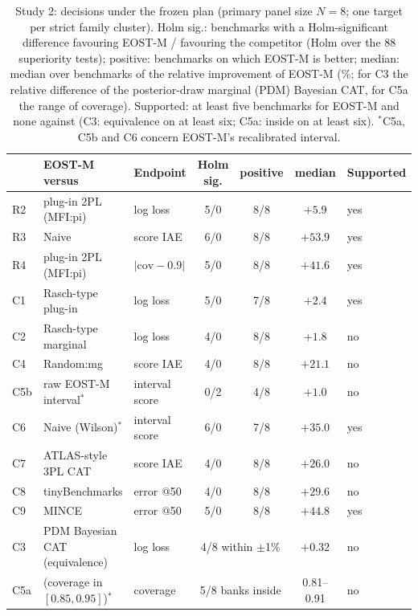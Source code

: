 \begin{table}[tbp]
\centering\footnotesize
\caption{Study 2: decisions under the frozen plan (primary panel size $N=8$; one target per strict family cluster). Holm sig.: benchmarks with a Holm-significant difference favouring EOST-M / favouring the competitor (Holm over the 88 superiority tests); positive: benchmarks on which EOST-M is better; median: median over benchmarks of the relative improvement of EOST-M (\%; for C3 the relative difference of the posterior-draw marginal (PDM) Bayesian CAT, for C5a the range of coverage). Supported: at least five benchmarks for EOST-M and none against (C3: equivalence on at least six; C5a: inside on at least six). $^\ast$C5a, C5b and C6 concern EOST-M's recalibrated interval.}
\label{tab:study2}
\setlength{\tabcolsep}{3pt}
\begin{tabular}{@{}lllcccl@{}}
\toprule
 & EOST-M versus & Endpoint & Holm sig. & positive & median & Supported \\
\midrule
R2 & plug-in 2PL (MFI:pi) & log loss & 5/0 & 8/8 & $+5.9$ & yes \\
R3 & Naive & score IAE & 6/0 & 8/8 & $+53.9$ & yes \\
R4 & plug-in 2PL (MFI:pi) & $|\mathrm{cov}-0.9|$ & 5/0 & 8/8 & $+41.6$ & yes \\
C1 & Rasch-type plug-in & log loss & 5/0 & 7/8 & $+2.4$ & yes \\
C2 & Rasch-type marginal & log loss & 4/0 & 8/8 & $+1.8$ & no \\
C4 & Random:mg & score IAE & 4/0 & 8/8 & $+21.1$ & no \\
C5b & raw EOST-M interval$^\ast$ & interval score & 0/2 & 4/8 & $+1.0$ & no \\
C6 & Naive (Wilson)$^\ast$ & interval score & 6/0 & 7/8 & $+35.0$ & yes \\
C7 & ATLAS-style 3PL CAT & score IAE & 4/0 & 8/8 & $+26.0$ & no \\
C8 & tinyBenchmarks & error @50 & 4/0 & 8/8 & $+29.6$ & no \\
C9 & MINCE & error @50 & 5/0 & 8/8 & $+44.8$ & yes \\
\midrule
C3 & PDM Bayesian CAT (equivalence) & log loss & \multicolumn{2}{c}{4/8 within $\pm$1\%} & $+0.32$ & no \\
C5a & (coverage in $[0.85,0.95]$)$^\ast$ & coverage & \multicolumn{2}{c}{5/8 banks inside} & 0.81--0.91 & no \\
\bottomrule
\end{tabular}
\end{table}

